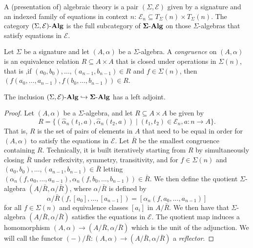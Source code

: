 \begin{definition}
  A (presentation of) algebraic theory is a pair $(\Sigma, \mathcal{E})$ given by a signature and an indexed family of equations in context $n$: $\mathcal{E}_{n} \subseteq T_{\Sigma}(n) \times T_{\Sigma}(n)$.
  The category $(\Sigma, \mathcal{E})\text{-}\mathbf{Alg}$ is the full subcategory of $\mathbf{\Sigma}\text{-}\mathbf{Alg}$ on those $\Sigma$-algebras that satisfy equations in $\mathcal{E}$.
\end{definition}

\begin{definition}\label{def:congruence}
Let $\Sigma$ be a signature and let $(A,\alpha)$ be a $\Sigma$-algebra.
A \emph{congruence} on $(A,\alpha)$ is an equivalence relation $R \subseteq A \times A$ that is closed under operations in $\Sigma(n)$, that is ,if
$(a_0, b_0), \ldots, (a_{n-1}, b_{n-1}) \in R$ and $f \in \Sigma(n)$, then $(f (a_0, \ldots, a_{n-1}), f(b_0, \ldots, b_{n-1})) \in R$.
\end{definition}
\begin{proposition}\label{prop:free_algebraic_theory}
The inclusion $(\Sigma, \mathcal{E})\text{-}\mathbf{Alg} \hookrightarrow \mathbf{\Sigma}\text{-}\mathbf{Alg}$ has a left adjoint.
\end{proposition}
\begin{proof}
Let $(A, \alpha)$ be a $\Sigma$-algebra, and let $R \subseteq A \times A$ be given by
\[
R = \{(\hat{\alpha}_{n}(t_1, a), \hat{\alpha}_{n}(t_2, a)) \;\vert\; (t_1, t_2) \in \mathcal{E}_n, a : n \to A\} .
\]
That is, $R$ is the set of pairs of elements in $A$ that need to be equal in order for $(A, \alpha)$ to satisfy the equations in $\mathcal{E}$.
Let $\bar{R}$ be the smallest congruence containing $R$.
Technically, it is built iteratively starting from $R$ by simultaneously closing $\bar{R}$ under reflexivity, symmetry, transitivity, and for $f \in \Sigma(n)$ and $(a_0, b_0), \ldots, (a_{n-1}, b_{n-1}) \in \bar{R}$ letting $(\alpha_{n}(f,a_0, \ldots, a_{n-1}), \alpha_{n}(f,b_0, \ldots, b_{n-1})) \in \bar{R}$.
We then define the quotient $\Sigma$-algebra $(A / \bar{R}, \alpha / \bar{R})$, where $\alpha / \bar{R}$ is defined by
\[
\alpha / \bar{R}(f, [a_0], \ldots, [a_{n-1}]) = [\alpha_{n}(f, a_0, \ldots, a_{n-1})]
\]
for all $f \in \Sigma(n)$ and equivalence classes $[a_i]$ in $A / \bar{R}$.
We then have that $\Sigma$-algebra $(A / \bar{R}, \alpha / \bar{R})$ satisfies the equations in $\mathcal{E}$.
The quotient map induces a homomorphism $(A, \alpha) \to (A / \bar{R}, \alpha / \bar{R})$ which is the unit of the adjunction.
We will call the functor $(-) / \bar{R} : (A, \alpha) \to (A / \bar{R}, \alpha / \bar{R})$ a \emph{reflector}.
\end{proof}
